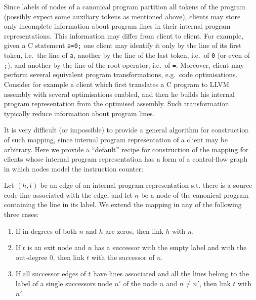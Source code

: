 \documentclass[envcountsame]{llncs}
\begin{document}
Since labels of nodes of a canonical program partition all tokens of the program
(possibly expect some auxiliary tokens as mentioned above), clients may store
only incomplete information about program lines in their internal program
representations. This information may differ from client to client. For example,
given a C statement \texttt{a=0;} one client may identify it only by the line of
its first token, i.e.~the line of \texttt{a}, another by the line of the last
token, i.e.~of \texttt{0} (or even of \texttt{;}), and another by the line of
the root operator, i.e.~of \texttt{=}. Moreover, client may perform several
equivalent program transformations, e.g.~code optimisations. Consider for
example a client which first translates a C program to LLVM assembly with
several optimisations enabled, and then he builds his internal program
representation from the optimised assembly. Such transformation typically reduce information about program lines.

It is very difficult (or impossible) to provide a general algorithm for
construction of such mapping, since internal program representation of a client
may be arbitrary. Here we provide a ``default'' recipe for construction of the
mapping for clients whose internal program representation has a form of a
control-flow graph in which nodes model the instruction counter:

Let $ (h,t) $ be an edge of an internal program representation s.t. there is a
source code line associated with the edge, and let $ n $ be a node of the
canonical program containing the line in its label. We extend the mapping in any
of the following three cases:
\begin{enumerate}
\item If in-degrees of both $ n $ and $ h $ are zeros, then link $ h $ with $ n
$. \item If $ t $ is an exit node and $ n $ has a successor with the empty label
and with the out-degree 0, then link $ t $ with the successor of $ n $. \item If all successor edges of $ t $ have lines associated and all the lines
belong to the label of a single successors node $ n' $ of the node $ n $ and $ n
\neq n' $, then link $ t $ with $ n' $.
\end{enumerate}
\end{document}
